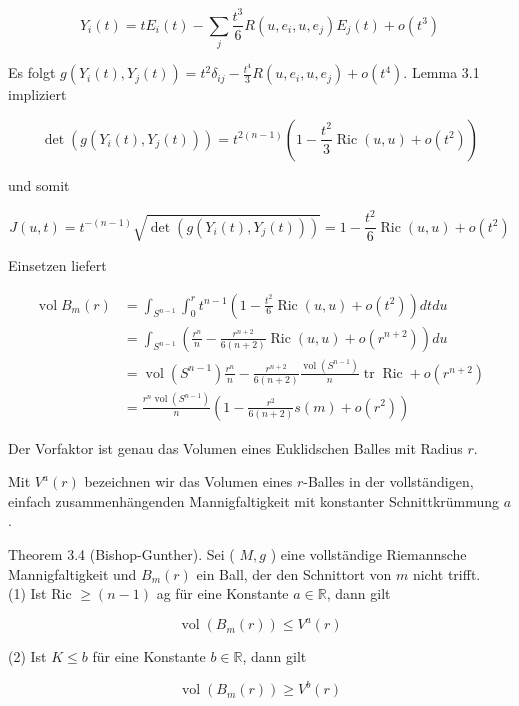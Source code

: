 \documentclass[10pt]{article}
\begin{document}
$$
Y_{i}(t)=t E_{i}(t)-\sum_{j} \frac{t^{3}}{6} R\left(u, e_{i}, u, e_{j}\right) E_{j}(t)+o\left(t^{3}\right)
$$

Es folgt $g\left(Y_{i}(t), Y_{j}(t)\right)=t^{2} \delta_{i j}-\frac{t^{4}}{3} R\left(u, e_{i}, u, e_{j}\right)+o\left(t^{4}\right)$. Lemma 3.1 impliziert

$$
\operatorname{det}\left(g\left(Y_{i}(t), Y_{j}(t)\right)\right)=t^{2(n-1)}\left(1-\frac{t^{2}}{3} \operatorname{Ric}(u, u)+o\left(t^{2}\right)\right)
$$

und somit

$$
J(u, t)=t^{-(n-1)} \sqrt{\operatorname{det}\left(g\left(Y_{i}(t), Y_{j}(t)\right)\right)}=1-\frac{t^{2}}{6} \operatorname{Ric}(u, u)+o\left(t^{2}\right)
$$

Einsetzen liefert

$$
\begin{aligned}
\operatorname{vol} B_{m}(r) & =\int_{S^{n-1}} \int_{0}^{r} t^{n-1}\left(1-\frac{t^{2}}{6} \operatorname{Ric}(u, u)+o\left(t^{2}\right)\right) d t d u \\
& =\int_{S^{n-1}}\left(\frac{r^{n}}{n}-\frac{r^{n+2}}{6(n+2)} \operatorname{Ric}(u, u)+o\left(r^{n+2}\right)\right) d u \\
& =\operatorname{vol}\left(S^{n-1}\right) \frac{r^{n}}{n}-\frac{r^{n+2}}{6(n+2)} \frac{\operatorname{vol}\left(S^{n-1}\right)}{n} \operatorname{tr} \operatorname{Ric}+o\left(r^{n+2}\right) \\
& =\frac{r^{n} \operatorname{vol}\left(S^{n-1}\right)}{n}\left(1-\frac{r^{2}}{6(n+2)} s(m)+o\left(r^{2}\right)\right)
\end{aligned}
$$

Der Vorfaktor ist genau das Volumen eines Euklidschen Balles mit Radius $r$.

Mit $V^{a}(r)$ bezeichnen wir das Volumen eines $r$-Balles in der vollständigen, einfach zusammenhängenden Mannigfaltigkeit mit konstanter Schnittkrümmung $a$.

Theorem 3.4 (Bishop-Gunther). Sei ( $M, g$ ) eine vollständige Riemannsche Mannigfaltigkeit und $B_{m}(r)$ ein Ball, der den Schnittort von $m$ nicht trifft.\\
(1) Ist Ric $\geq(n-1)$ ag für eine Konstante $a \in \mathbb{R}$, dann gilt

$$
\operatorname{vol}\left(B_{m}(r)\right) \leq V^{a}(r)
$$

(2) Ist $K \leq b$ für eine Konstante $b \in \mathbb{R}$, dann gilt

$$
\operatorname{vol}\left(B_{m}(r)\right) \geq V^{b}(r)
$$
\end{document}
